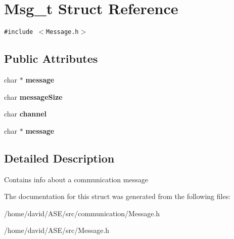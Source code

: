 \hypertarget{structMsg__t}{
\section{Msg\_\-t Struct Reference}
\label{structMsg__t}
}
{\tt \#include $<$Message.h$>$}

\subsection*{Public Attributes}
\begin{CompactItemize}
\item 
\hypertarget{structMsg__t_6bb847a9d1fd95ff580af8c90c3f29da}{
char $\ast$ \textbf{message}}
\label{structMsg__t_6bb847a9d1fd95ff580af8c90c3f29da}

\item 
\hypertarget{structMsg__t_19d34d0b167dce682188cb8a99632590}{
char \textbf{messageSize}}
\label{structMsg__t_19d34d0b167dce682188cb8a99632590}

\item 
\hypertarget{structMsg__t_b0457e50e0f08b605be2c5a5eafa09db}{
char \textbf{channel}}
\label{structMsg__t_b0457e50e0f08b605be2c5a5eafa09db}

\item 
\hypertarget{structMsg__t_6bb847a9d1fd95ff580af8c90c3f29da}{
char $\ast$ \textbf{message}}
\label{structMsg__t_6bb847a9d1fd95ff580af8c90c3f29da}

\end{CompactItemize}


\subsection{Detailed Description}
Contains info about a communication message 

The documentation for this struct was generated from the following files:\begin{CompactItemize}
\item 
/home/david/ASE/src/communication/Message.h\item 
/home/david/ASE/src/Message.h\end{CompactItemize}
